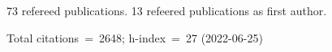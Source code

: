 73 refereed publications. 13 refeered publications as first author.

Total citations~=~2648; h-index~=~27 (2022-06-25)